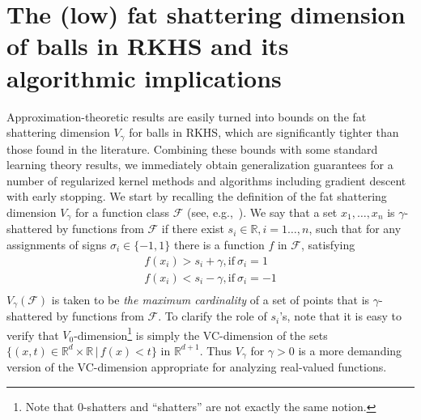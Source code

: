 \documentclass[final,12pt]{colt2018}
\newcommand{\F}{\mathcal{F}}
\newcommand{\R}{\mathbb{R}}
\begin{document}
\section{The (low) fat shattering dimension of balls in RKHS  and its algorithmic implications}\label{sec:fat_shatter}
\vskip-5pt
Approximation-theoretic results are easily turned into bounds on the fat shattering dimension $V_\gamma$ for balls in RKHS, 
which are significantly tighter than those found in the literature. Combining these bounds with some standard learning theory results, we immediately obtain  generalization guarantees 
for a number of regularized kernel  methods and algorithms including   gradient descent with early stopping. 
%
%
%
We start by recalling the definition of the fat shattering dimension $V_\gamma$ for a function class $\F$ (see, e.g.,~\cite{alon1997scale}).
We say that a set $x_1,\ldots,x_n$ is $\gamma$-shattered by functions from $\F$ if there exist $s_i \in \R, i=1\ldots,n$, such that for any assignments of signs $\sigma_i \in \{-1,1\}$ there is a function $f$ in $\F$, satisfying
\[
 \left.  \begin{array}{l}
    f(x_i) > s_i + \gamma, \textrm{if} ~\sigma_i =1\\
    f(x_i) < s_i - \gamma, \textrm{if} ~\sigma_i =-1\\
  \end{array}\right.
\]
$V_\gamma(\F)$  is taken to be {\it the maximum cardinality} of a  set of points that is $\gamma$-shattered by functions from $\F$. 
To clarify the role of  $s_i$'s, note that it is easy to verify that $V_0$-dimension\footnote{Note that  0-shatters and ``shatters'' are not exactly the same notion.} is simply the VC-dimension of the sets $\{(x,t) \in \R^d\times\R \,| \,f(x) < t\}$ in $\R^{d+1}$.  Thus $V_\gamma$  for $\gamma>0$ is  a more demanding version of the VC-dimension appropriate for analyzing real-valued functions. 
\end{document}
